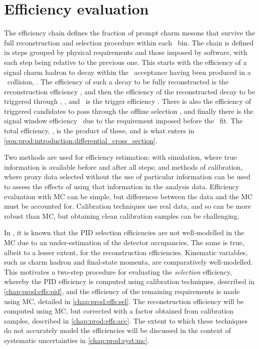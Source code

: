 \chapter{Efficiency evaluation}
\label{chap:prod:effs}

The efficiency chain defines the fraction of prompt charm mesons that survive
the full reconstruction and selection procedure within each \pTy\ bin.
The chain is defined in steps grouped by physical requirements and those
imposed by software, with each step being relative to the previous one.
This starts with the efficiency of a signal charm hadron to decay within the
\lhcb\ acceptance having been produced in a \pp\ collision, \effacc.
The efficiency of such a decay to be fully reconstructed is the reconstruction
efficiency \effreco, and then the efficiency of the reconstructed decay to
be triggered through \lzero, \hltone, and \hlttwo\ is the trigger efficiency
\efftrig.
There is also the efficiency of triggered candidates to pass through the
offline selection \effoffline, and finally there is the signal window
efficiency \effsigwin\ due to the requirement imposed before the \lnipchisq\
fit.
The total efficiency, \eff, is the product of these, and is what enters in
\cref{eqn:prod:introduction:differential_cross_section}.

Two methods are used for efficiency estimation: with simulation, where
true information is available before and after all steps; and methods of
calibration, where proxy data selected without the use of particular
information can be used to assess the effects of using that information in the
analysis data.
Efficiency evaluation with \ac{MC} can be simple, but differences between the
data and the \ac{MC} must be accounted for.
Calibration techniques use real data, and so can be more robust than \ac{MC},
but obtaining clean calibration samples can be challenging.

In \lhcb, it is known that the \ac{PID} selection efficiencies are not
well-modelled in the \ac{MC} due to an under-estimation of the detector
occupancies.
The same is true, albeit to a lesser extent, for the reconstruction
efficiencies.
Kinematic variables, such as charm hadron and final-state momenta, are
comparatively well-modelled.
This motivates a two-step procedure for evaluating the \emph{selection}
efficiency, whereby the \ac{PID} efficiency is computed using calibration
techniques, described in \cref{chap:prod:effs:pid}, and the efficiency of the remaining
requirements is made using \ac{MC}, detailed in \cref{chap:prod:effs:sel}.
The reconstruction efficiency will be computed using \ac{MC}, but corrected
with a factor obtained from calibration samples, described in \cref{chap:prod:effs:acc}.
The extent to which these techniques do not accurately model the efficiencies
will be discussed in the context of systematic uncertainties in
\cref{chap:prod:syst:mc}.

